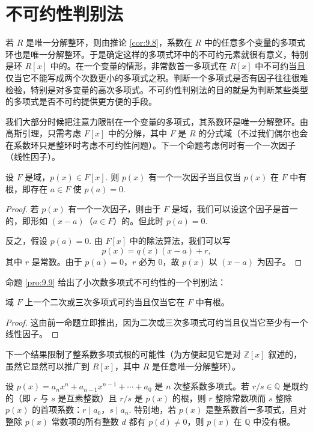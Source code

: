 \section{不可约性判别法}

若 \(R\) 是唯一分解整环，则由推论 \ref{cor:9.8}，系数在 \(R\) 中的任意多个变量的多项式环也是唯一分解整环。于是确定这样的多项式环中的不可约元素就很有意义，特别是环 \(R[x]\) 中的。在一个变量的情形，非常数首一多项式在 \(R[x]\) 中不可约当且仅当它不能写成两个次数更小的多项式之积。判断一个多项式是否有因子往往很难检验，特别是对多变量的高次多项式。不可约性判别法的目的就是为判断某些类型的多项式是否不可约提供更方便的手段。

我们大部分时候把注意力限制在一个变量的多项式，其系数环是唯一分解整环。由高斯引理，只需考虑 \(F[x]\) 中的分解，其中 \(F\) 是 \(R\) 的分式域（不过我们偶尔也会在系数环只是整环时考虑不可约性问题）。下一个命题考虑何时有一个一次因子（线性因子）。

\begin{proposition}\label{pro:9.9}
设 \(F\) 是域，\(p(x) \in F[x]\). 则 \(p(x)\) 有一个一次因子当且仅当 \(p(x)\) 在 \(F\) 中有根，即存在 \(a \in F\) 使 \(p(a) = 0\).
\end{proposition}

\begin{proof}
若 \(p(x)\) 有一个一次因子，则由于 \(F\) 是域，我们可以设这个因子是首一的，即形如 \((x-a)\)（\(a \in F\)）的。但此时 \(p(a) = 0\).

反之，假设 \(p(a) = 0\). 由 \(F[x]\) 中的除法算法，我们可以写
\[
p(x) = q(x)(x-a) + r,
\]
其中 \(r\) 是常数。由于 \(p(a) = 0\)，\(r\) 必为 0，故 \(p(x)\) 以 \((x-a)\) 为因子。
\end{proof}

命题 \ref{pro:9.9} 给出了小次数多项式不可约性的一个判别法：

\begin{proposition}\label{pro:9.10}
域 \(F\) 上一个二次或三次多项式可约当且仅当它在 \(F\) 中有根。
\end{proposition}

\begin{proof}
这由前一命题立即推出，因为二次或三次多项式可约当且仅当它至少有一个线性因子。
\end{proof}

下一个结果限制了整系数多项式根的可能性（为方便起见它是对 \(\mathbb{Z}[x]\) 叙述的，虽然它显然可以推广到 \(R[x]\)，其中 \(R\) 是任意唯一分解整环）。

\begin{proposition}\label{pro:9.11}
设 \(p(x) = a_nx^n + a_{n-1}x^{n-1} + \cdots + a_0\) 是 \(n\) 次整系数多项式。若 \(r/s \in \mathbb{Q}\) 是既约的（即 \(r\) 与 \(s\) 是互素整数）且 \(r/s\) 是 \(p(x)\) 的根，则 \(r\) 整除常数项而 \(s\) 整除 \(p(x)\) 的首项系数：\(r \mid a_0\)，\(s \mid a_n\). 特别地，若 \(p(x)\) 是整系数首一多项式，且对整除 \(p(x)\) 常数项的所有整数 \(d\) 都有 \(p(d) \neq 0\)，则 \(p(x)\) 在 \(\mathbb{Q}\) 中没有根。
\end{proposition}

